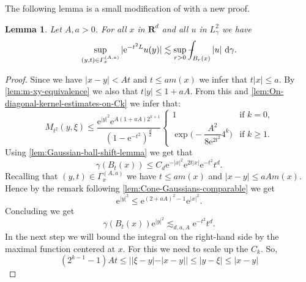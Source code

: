 \documentclass[a4paper,oneside,10pt]{amsproc}
\theoremstyle{plain}
\newtheorem{lemma}{Lemma}
\theoremstyle{remark}
\theoremstyle{definition}
\newcommand{\D}{\,\textup{d}}
\newcommand{\LHG}{{L^2_\gamma}}
\def\Xint#1{\mathchoice
  {\XXint\displaystyle\textstyle{#1}}%
  {\XXint\textstyle\scriptstyle{#1}}%
  {\XXint\scriptstyle\scriptscriptstyle{#1}}%
  {\XXint\scriptscriptstyle\scriptscriptstyle{#1}}%
  \!\int}
\def\XXint#1#2#3{{\setbox0=\hbox{$#1{#2#3}{\int}$ }
    \vcenter{\hbox{$#2#3$ }}\kern-.535\wd0}}
\def\dashint{\Xint-}
\renewcommand{\leq}{\leqslant}
\renewcommand{\leq}{\leqslant}
\renewcommand{\geq}{\geqslant}
\newcommand{\R}{\mathbf R}
\newcommand{\e}{\mathrm{e}} %
\renewcommand{\leq}{\leqslant}%
\renewcommand{\geq}{\geqslant}%
\begin{document}
The following lemma is a small modification of \cite[lemma 1.1]{Pineda2008} with a new proof.
\begin{lemma}\label{lem:Maximal-function-cone}
  Let $A, a > 0$. For all $x$ in $\R^d$ and all $u$ in $\LHG$ we have
  \begin{equation}
    \label{eq:maximal_function_cone}
    \sup_{(y, t) \in \Gamma_x^{(A, a)}} |\e^{-t^2 L} u(y)| \lesssim
    \sup_{r > 0} \dashint_{B_r(x)} |u| \, \D\gamma.
  \end{equation}
\end{lemma}
\begin{proof}
  Since we have $|x - y| < At$ and $t \leq a m(x)$ we infer that $t
  |x| \leq a$. By \autoref{lem:m-xy-equivalence} we also that $t
  |y| \leq 1 + aA$. From this and \autoref{lem:On-diagonal-kernel-estimates-on-Ck} we infer that:
  \begin{equation}
    \label{eq:Mehler-kernel-estimate-one-sided-bound}
    M_{t^2}(y, \xi) \leq \frac{\e^{|y|^2} \e^{A(1 + aA) 2^{k + 1}}}{(1 - \e^{-t^2})^{\frac{d}2}}
    \begin{cases}
      1 &\text{if $k = 0$,}\\
      \exp\biggl(-\dfrac{A^2}{8 \e^{2t^2}} 4^k \biggr) &\text{if $k
        \geq 1$.}
    \end{cases}
  \end{equation}
  Using \autoref{lem:Gaussian-ball-shift-lemma} we get that
  \begin{equation}
    \label{eq:Gaussian-ball-Maximal-function-cone-proof-1}
    \gamma(B_t(x)) \leq C_d \e^{-|x|^2} \e^{2 t |x|} \e^{-t^2} t^d.
  \end{equation}
  Recalling that $(y, t) \in \Gamma_x^{(A, a)}$ we have $t \leq a
  m(x)$ and $|x - y| \leq aA m(x)$. Hence by the remark following
  \autoref{lem:Cone-Gaussians-comparable} we get
  \begin{equation*}
    \e^{|y|^2} \leq \e^{(2 + aA)^2 - 1} \e^{|x|^2}.
  \end{equation*}
  Concluding we get
  \begin{equation}
    \label{eq:Gaussian-ball-Maximal-function-cone-proof-2}
    \gamma(B_t(x)) \e^{|y|^2} \lesssim_{d, a, A} \e^{-t^2} t^d.
  \end{equation}
In the next step we will bound the integral on the right-hand side
  by the maximal function centered at $x$. For this we need to scale
  up the $C_k$. So,
  \begin{equation*}
    (2^{k - 1} - 1) A t \leq ||\xi - y|- |x - y|| \leq |y - \xi| \leq |x - y|

\end{equation*}
\end{proof}
\end{document}
